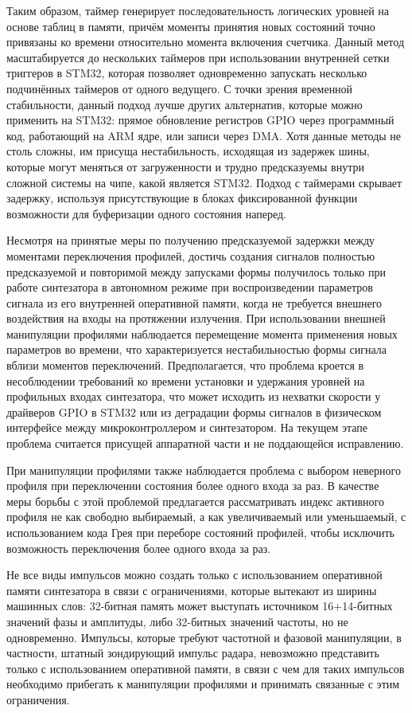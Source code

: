 \documentclass{report}
\begin{document}
Таким образом, таймер генерирует последовательность логических уровней на основе таблиц в памяти, причём моменты принятия новых состояний точно привязаны ко времени относительно момента включения счетчика. Данный метод масштабируется до нескольких таймеров при использовании внутренней сетки триггеров в STM32, которая позволяет одновременно запускать несколько подчинённых таймеров от одного ведущего. С точки зрения временной стабильности, данный подход лучше других альтернатив, которые можно применить на STM32: прямое обновление регистров GPIO через программный код, работающий на ARM ядре, или записи через DMA. Хотя данные методы не столь сложны, им присуща нестабильность, исходящая из задержек шины, которые могут меняться от загруженности \cite{stm32dmalatency} и трудно предсказуемы внутри сложной системы на чипе, какой является STM32. Подход с таймерами скрывает задержку, используя присутствующие в блоках фиксированной функции возможности для буферизации одного состояния наперед.

Несмотря на принятые меры по получению предсказуемой задержки между моментами переключения профилей, достичь создания сигналов полностью предсказуемой и повторимой между запусками формы получилось только при работе синтезатора в автономном режиме при воспроизведении параметров сигнала из его внутренней оперативной памяти, когда не требуется внешнего воздействия на входы на протяжении излучения. При использовании внешней манипуляции профилями наблюдается перемещение момента применения новых параметров во времени, что характеризуется нестабильностью формы сигнала вблизи моментов переключений. Предполагается, что проблема кроется в несоблюдении требований ко времени установки и удержания уровней на профильных входах синтезатора, что может исходить из нехватки скорости у драйверов GPIO в STM32 или из деградации формы сигналов в физическом интерфейсе между микроконтроллером и синтезатором. На текущем этапе проблема считается присущей аппаратной части и не поддающейся исправлению.

При манипуляции профилями также наблюдается проблема с выбором неверного профиля при переключении состояния более одного входа за раз. В качестве меры борьбы с этой проблемой предлагается рассматривать индекс активного профиля не как свободно выбираемый, а как увеличиваемый или уменьшаемый, с использованием кода Грея при переборе состояний профилей, чтобы исключить возможность переключения более одного входа за раз.

Не все виды импульсов можно создать только с использованием оперативной памяти синтезатора в связи с ограничениями, которые вытекают из ширины машинных слов: 32-битная память может выступать источником 16+14-битных значений фазы и амплитуды, либо 32-битных значений частоты, но не одновременно. Импульсы, которые требуют частотной и фазовой манипуляции, в частности, штатный зондирующий импульс радара, невозможно представить только с использованием оперативной памяти, в связи с чем для таких импульсов необходимо прибегать к манипуляции профилями и принимать связанные с этим ограничения.
\end{document}
